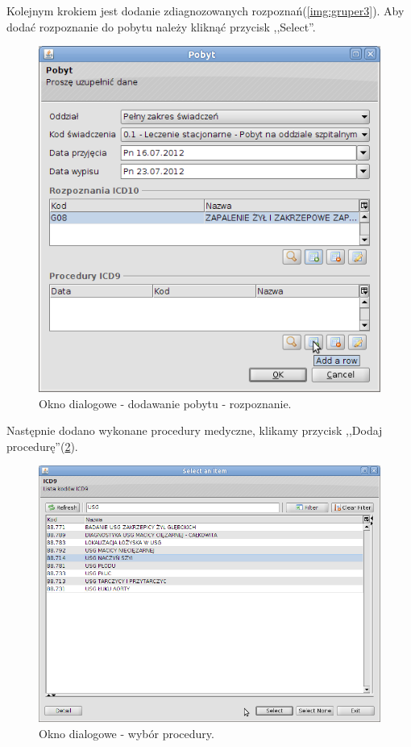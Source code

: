 Kolejnym krokiem jest dodanie zdiagnozowanych rozpoznań(\ref{img:gruper3}). Aby dodać rozpoznanie do pobytu należy kliknąć przycisk ,,Select''.

\begin{figure}%
\centering
\includegraphics[scale=0.4]{images/gruper4}
\caption[Widok grupera]{Okno dialogowe - dodawanie pobytu - rozpoznanie.}
\label{img:gruper4}
\end{figure}

Następnie dodano wykonane procedury medyczne, klikamy przycisk ,,Dodaj procedurę''(\ref{img:gruper5}).

\begin{figure}%
\centering
\includegraphics[scale=0.4]{images/gruper5}
\caption[Widok grupera]{Okno dialogowe - wybór procedury.}
\label{img:gruper5}
\end{figure}

